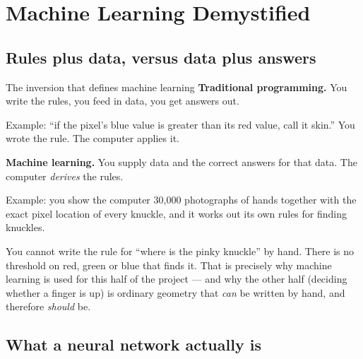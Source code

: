 \section{Machine Learning Demystified}
\label{sec:ml}

\subsection{Rules plus data, versus data plus answers}

\begin{mlconcept}{The inversion that defines machine learning}
\textbf{Traditional programming.} You write the rules, you feed in data, you get answers out.

\begin{center}
\end{center}

Example: ``if the pixel's blue value is greater than its red value, call it skin.'' You wrote the
rule. The computer applies it.

\textbf{Machine learning.} You supply data and the correct answers for that data. The computer
\emph{derives} the rules.

\begin{center}
\end{center}

Example: you show the computer 30{,}000 photographs of hands together with the exact pixel location
of every knuckle, and it works out its own rules for finding knuckles.

You cannot write the rule for ``where is the pinky knuckle'' by hand. There is no threshold on red,
green or blue that finds it. That is precisely why machine learning is used for this half of the
project --- and why the other half (deciding whether a finger is up) is ordinary geometry that
\emph{can} be written by hand, and therefore \emph{should} be.
\end{mlconcept}

\subsection{What a neural network actually is}

